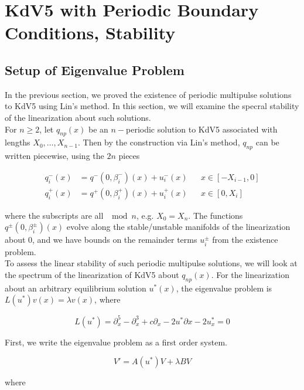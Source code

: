 \documentclass[12pt]{article}
\begin{document}
\section{KdV5 with Periodic Boundary Conditions, Stability}

\subsection{Setup of Eigenvalue Problem}

In the previous section, we proved the existence of periodic multipulse solutions to KdV5 using Lin's method. In this section, we will examine the specral stability of the linearization about such solutions.\\

For $n \geq 2$, let $q_{np}(x)$ be an $n-$periodic solution to KdV5 associated with lengths $X_0, \dots, X_{n-1}$. Then by the construction via Lin's method, $q_{np}$ can be written piecewise, using the $2n$ pieces

\begin{align*}
q_i^-(x) &= q^-(0, \beta_i^-)(x) + u_i^-(x) && x \in [-X_{i-1}, 0]\\
q_i^+(x) &= q^+(0, \beta_i^+)(x) + u_i^+(x) && x \in [0, X_i]
\end{align*}

where the subscripts are all $\mod n$, e.g. $X_0 = X_n$. The functions $q^\pm(0, \beta_i^\pm)(x)$ evolve along the stable/unstable manifolds of the linearization about 0, and we have bounds on the remainder terms $u_i^\pm$ from the existence problem.\\

To assess the linear stability of such periodic multipulse solutions, we will look at the spectrum of the linearization of KdV5 about $q_{np}(x)$. For the linearization about an arbitrary equilibrium solution $u^*(x)$, the eigenvalue problem is $L(u^*) v(x) = \lambda v(x)$, where

\begin{equation}
L(u^*) = \partial_x^5 - \partial_x^3 + c \partial_x
 - 2 u^* \partial x - 2 u^*_x = 0
\end{equation}

First, we write the eigenvalue problem as a first order system.

\begin{equation}
V' = A(u^*)V + \lambda B V
\end{equation}

where
\end{document}
